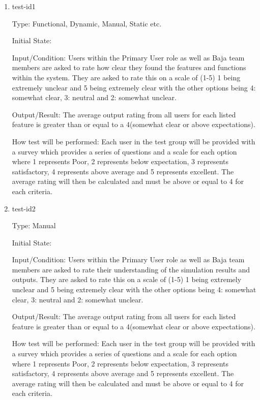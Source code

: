 \documentclass[12pt, titlepage]{article}
\begin{document}
\begin{enumerate}

\item{test-id1\\}

Type: Functional, Dynamic, Manual, Static etc.
					
Initial State: 
					
Input/Condition: Users within the Primary User role as well as Baja team members are asked to rate how clear they found the features and functions within the system. 
They are asked to rate this on a scale of (1-5) 1 being extremely unclear and 5 being extremely clear with the other options being 4: somewhat clear, 3: neutral and 2: somewhat unclear. 
					
Output/Result: The average output rating from all users for each listed feature is greater than or equal to a 4(somewhat clear or above expectations).
					
How test will be performed: Each user in the test group will be provided with a survey which provides a series of questions and a scale for each option where 1 represents Poor, 2 represents below expectation, 3 represents satisfactory, 4 represents above average and 5 represents excellent.
The average rating will then be calculated and must be above or equal to 4 for each criteria.  

\item{test-id2\\}

Type: Manual
					
Initial State: 
					
Input/Condition: Users within the Primary User role as well as Baja team members are asked to rate their understanding of the simulation results and outputs. 
They are asked to rate this on a scale of (1-5) 1 being extremely unclear and 5 being extremely clear with the other options being 4: somewhat clear, 3: neutral and 2: somewhat unclear. 
					
Output/Result: The average output rating from all users for each listed feature is greater than or equal to a 4(somewhat clear or above expectations).
					
How test will be performed: Each user in the test group will be provided with a survey which provides a series of questions and a scale for each option where 1 represents Poor, 2 represents below expectation, 3 represents satisfactory, 4 represents above average and 5 represents excellent.
The average rating will then be calculated and must be above or equal to 4 for each criteria.  

\end{enumerate}
\end{document}
